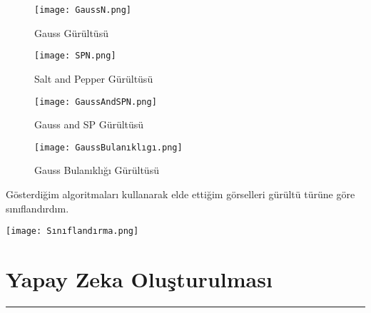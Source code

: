 \documentclass{article}
\begin{document}
\begin{figure}
     \centering
 \noindent \texttt{[image: GaussN.png]}\centering 
  \caption{Gauss Gürültüsü}
  \label{fig:resim_etiketi}
\end{figure}


\begin{figure}
     \centering
  \texttt{[image: SPN.png]}\centering 
  \caption{Salt and Pepper Gürültüsü}
  \label{fig:resim_etiketi}
\end{figure}

\begin{figure}
     \centering
  \texttt{[image: GaussAndSPN.png]}\centering 
  \caption{Gauss and SP Gürültüsü}
  \label{fig:resim_etiketi}
\end{figure}

\begin{figure}
     \centering
  \texttt{[image: GaussBulanıklıgı.png]}\centering 
  \caption{Gauss Bulanıklığı Gürültüsü}
  \label{fig:resim_etiketi}
\end{figure}

\newpage
\noindent Gösterdiğim algoritmaları kullanarak elde ettiğim görselleri gürültü türüne göre sınıflandırdım.\vspace{0,5cm}

\texttt{[image: Sınıflandırma.png]}\vspace{0,5cm}

\newpage
\section{Yapay Zeka Oluşturulması}
\rule{\textwidth}{0.5pt}\\[10pt]
\end{document}
